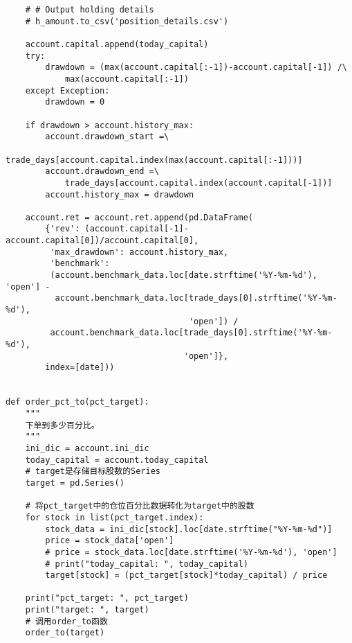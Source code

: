 \documentclass[11pt]{article}
\begin{document}
\begin{lstlisting}
    # # Output holding details
    # h_amount.to_csv('position_details.csv')

    account.capital.append(today_capital)
    try:
        drawdown = (max(account.capital[:-1])-account.capital[-1]) /\
            max(account.capital[:-1])
    except Exception:
        drawdown = 0

    if drawdown > account.history_max:
        account.drawdown_start =\
            trade_days[account.capital.index(max(account.capital[:-1]))]
        account.drawdown_end =\
            trade_days[account.capital.index(account.capital[-1])]
        account.history_max = drawdown

    account.ret = account.ret.append(pd.DataFrame(
        {'rev': (account.capital[-1]-account.capital[0])/account.capital[0],
         'max_drawdown': account.history_max,
         'benchmark':
         (account.benchmark_data.loc[date.strftime('%Y-%m-%d'), 'open'] -
          account.benchmark_data.loc[trade_days[0].strftime('%Y-%m-%d'),
                                     'open']) /
         account.benchmark_data.loc[trade_days[0].strftime('%Y-%m-%d'),
                                    'open']},
        index=[date]))


def order_pct_to(pct_target):
    """
    下单到多少百分比。
    """
    ini_dic = account.ini_dic
    today_capital = account.today_capital
    # target是存储目标股数的Series
    target = pd.Series()

    # 将pct_target中的仓位百分比数据转化为target中的股数
    for stock in list(pct_target.index):
        stock_data = ini_dic[stock].loc[date.strftime("%Y-%m-%d")]
        price = stock_data['open']
        # price = stock_data.loc[date.strftime('%Y-%m-%d'), 'open']
        # print("today_capital: ", today_capital)
        target[stock] = (pct_target[stock]*today_capital) / price

    print("pct_target: ", pct_target)
    print("target: ", target)
    # 调用order_to函数
    order_to(target)



\end{lstlisting}
\end{document}
